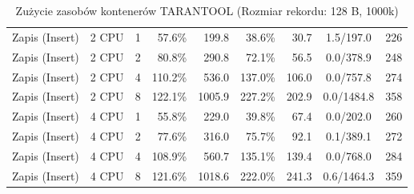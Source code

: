 \begin{table}[ht]
{\begin{tabular}{llcrrrrcc}
Zapis (Insert) & 2 CPU & 1 & 57.6\% & 199.8 & 38.6\% & 30.7 & 1.5/197.0 & 226 \\
Zapis (Insert) & 2 CPU & 2 & 80.8\% & 290.8 & 72.1\% & 56.5 & 0.0/378.9 & 248 \\
Zapis (Insert) & 2 CPU & 4 & 110.2\% & 536.0 & 137.0\% & 106.0 & 0.0/757.8 & 274 \\
Zapis (Insert) & 2 CPU & 8 & 122.1\% & 1005.9 & 227.2\% & 202.9 & 0.0/1484.8 & 358 \\
Zapis (Insert) & 4 CPU & 1 & 55.8\% & 229.0 & 39.8\% & 67.4 & 0.0/202.0 & 260 \\
Zapis (Insert) & 4 CPU & 2 & 77.6\% & 316.0 & 75.7\% & 92.1 & 0.1/389.1 & 272 \\
Zapis (Insert) & 4 CPU & 4 & 108.9\% & 560.7 & 135.1\% & 139.4 & 0.0/768.0 & 284 \\
Zapis (Insert) & 4 CPU & 8 & 121.6\% & 1018.6 & 222.0\% & 241.3 & 0.6/1464.3 & 359 \\
\bottomrule
\end{tabular}%
}
\caption{Zużycie zasobów kontenerów TARANTOOL (Rozmiar rekordu: 128 B, 1000k)}
\label{tab:resources_tarantool_small_1000000}
\end{table}
